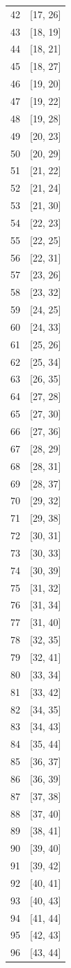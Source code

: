 \documentclass{article}%
\begin{document}
\begin{longtable}{| c | c |}
42&{[}17, 26{]}\\%
43&{[}18, 19{]}\\%
44&{[}18, 21{]}\\%
45&{[}18, 27{]}\\%
46&{[}19, 20{]}\\%
47&{[}19, 22{]}\\%
48&{[}19, 28{]}\\%
49&{[}20, 23{]}\\%
50&{[}20, 29{]}\\%
51&{[}21, 22{]}\\%
52&{[}21, 24{]}\\%
53&{[}21, 30{]}\\%
54&{[}22, 23{]}\\%
55&{[}22, 25{]}\\%
56&{[}22, 31{]}\\%
57&{[}23, 26{]}\\%
58&{[}23, 32{]}\\%
59&{[}24, 25{]}\\%
60&{[}24, 33{]}\\%
61&{[}25, 26{]}\\%
62&{[}25, 34{]}\\%
63&{[}26, 35{]}\\%
64&{[}27, 28{]}\\%
65&{[}27, 30{]}\\%
66&{[}27, 36{]}\\%
67&{[}28, 29{]}\\%
68&{[}28, 31{]}\\%
69&{[}28, 37{]}\\%
70&{[}29, 32{]}\\%
71&{[}29, 38{]}\\%
72&{[}30, 31{]}\\%
73&{[}30, 33{]}\\%
74&{[}30, 39{]}\\%
75&{[}31, 32{]}\\%
76&{[}31, 34{]}\\%
77&{[}31, 40{]}\\%
78&{[}32, 35{]}\\%
79&{[}32, 41{]}\\%
80&{[}33, 34{]}\\%
81&{[}33, 42{]}\\%
82&{[}34, 35{]}\\%
83&{[}34, 43{]}\\%
84&{[}35, 44{]}\\%
85&{[}36, 37{]}\\%
86&{[}36, 39{]}\\%
87&{[}37, 38{]}\\%
88&{[}37, 40{]}\\%
89&{[}38, 41{]}\\%
90&{[}39, 40{]}\\%
91&{[}39, 42{]}\\%
92&{[}40, 41{]}\\%
93&{[}40, 43{]}\\%
94&{[}41, 44{]}\\%
95&{[}42, 43{]}\\%
96&{[}43, 44{]}\\%
\end{longtable}%
\newpage
\end{document}
